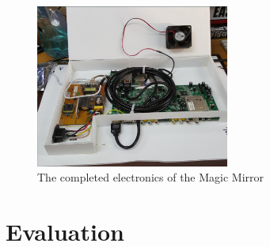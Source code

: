 \documentclass[conference]{IEEEtran}
\begin{document}
\begin{figure}[!ht]
  \centering
  \includegraphics[width=2.5in]{images/Electronics.png}
  \caption{The completed electronics of the Magic Mirror}
  \label{fig:elec}
\end{figure}


\section{Evaluation}
\end{document}
